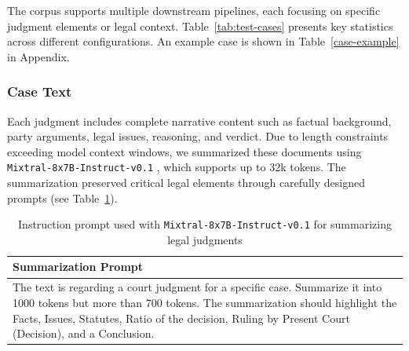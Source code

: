 The corpus supports multiple downstream pipelines, each focusing on specific judgment elements or legal context. Table~\ref{tab:test-cases} presents key statistics across different configurations.
An example case is shown in Table~\ref{case-example} in Appendix.

\subsubsection{Case Text}

Each judgment includes complete narrative content such as factual background, party arguments, legal issues, reasoning, and verdict. Due to length constraints exceeding model context windows, we summarized these documents using \texttt{Mixtral-8x7B-Instruct-v0.1} \citep{Jiang2024MixtralOE}, which supports up to 32k tokens. The summarization preserved critical legal elements through carefully designed prompts (see Table~\ref{tab:Instruction-sets-summarize}).

\begin{table}[t]
\centering
{}
\vspace*{-2mm}
\caption{NyayaRAG data statistics}
\label{tab:test-cases}
\end{table}

\begin{table}[t]
\centering
\begin{tabular}{p{}}
\toprule
\textbf{Summarization Prompt} \\
\midrule
\footnotesize
The text is regarding a court judgment for a specific case. Summarize it into 1000 tokens but more than 700 tokens. The summarization should highlight the Facts, Issues, Statutes, Ratio of the decision, Ruling by Present Court (Decision), and a Conclusion. \\
\bottomrule
\end{tabular}
\vspace*{-2mm}
\caption{Instruction prompt used with \texttt{Mixtral-8x7B-Instruct-v0.1} for summarizing legal judgments}
\label{tab:Instruction-sets-summarize}
\end{table}


